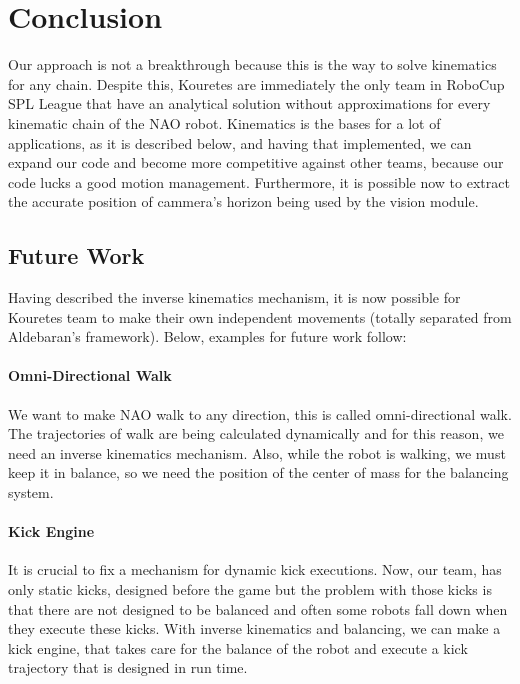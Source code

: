 \chapter{Conclusion}
\label{conclusion}
Our approach is not a breakthrough because this is the way to solve kinematics for any chain. Despite this, Kouretes are immediately the only team in RoboCup SPL League that have an analytical solution without approximations for every kinematic chain of the NAO robot. Kinematics is the bases for a lot of applications, as it is described below, and having that implemented, we can expand our code and become more competitive against other teams, because our code lucks a good motion management. Furthermore, it is possible now to extract the accurate position of cammera's horizon being used by the vision module.  
\section{Future Work}
Having described the inverse kinematics mechanism, it is now possible for Kouretes team to make their own independent movements (totally separated from Aldebaran's framework). Below, examples for future work follow:

\subsubsection*{Omni-Directional Walk}
We want to make NAO walk to any direction, this is called omni-directional walk. The trajectories of walk are being calculated dynamically and for this reason, we need an inverse kinematics mechanism. Also, while the robot is walking, we must keep it in balance, so we need the position of the center of mass for the balancing system.

\subsubsection*{Kick Engine}
It is crucial to fix a mechanism for dynamic kick executions. Now, our team, has only static kicks, designed before the game but the problem with those kicks is that there are not designed to be balanced and often some robots fall down when they execute these kicks. With inverse kinematics and balancing, we can make a kick engine, that takes care for the balance of the robot and execute a kick trajectory that is designed in run time.